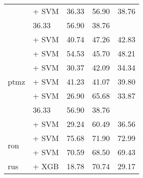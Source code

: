 \begin{sidewaystable}[h]
{\begin{tabular}{llccc}
                                               & \citep{melo2023bertlargeportuguesests} + SVM                       & 36.33                                & 56.90              & 38.76             \\                                             & 36.33                                & 56.90              & 38.76             \\
                                               & \citep{sturua2024jinaembeddingsv3multilingualembeddingstask} + SVM & 40.74                                & 47.26              & 42.83             \\
            \multirow{5}{*}{ptmz}              & \citep{wang2024multilingual} + SVM                                 & 54.53                                & 45.70              & 48.21             \\
                                               & \citep{filho2023bertportuguesenliassin2} + SVM                     & 30.37                                & 42.09              & 34.34             \\
                                               & \citep{souza2020bertimbau} + SVM                                   & 41.23                                & 41.07              & 39.80             \\
                                               & \citep{melo2023bertlargeportuguesests} + SVM                       & 26.90                                & 65.68              & 33.87             \\                                       & 36.33                                & 56.90              & 38.76             \\
                                               & \citep{sturua2024jinaembeddingsv3multilingualembeddingstask} + SVM & 29.24                                & 60.49              & 36.56             \\
            \midrule
            \multirow{2}{*}{ron}               & \citep{wang2024multilingual} + SVM                                 & 75.68                                & 71.90              & 72.99             \\
                                               & \citep{sturua2024jinaembeddingsv3multilingualembeddingstask} + SVM & 70.59                                & 68.50              & 69.43             \\
            \midrule
            \multirow{3}{*}{rus}               & \citep{all-MiniLM-L12-v2} + XGB                                    & 18.78                                & 70.74              & 29.17             \\

\end{tabular}}
\end{sidewaystable}
